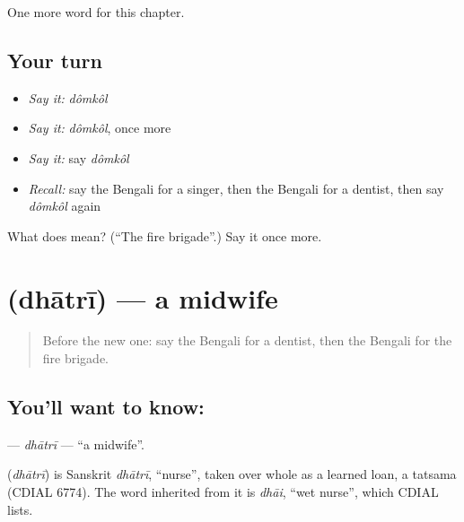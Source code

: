 \begin{grammarlens}[title={What you've built}]
One more word for this chapter.
\end{grammarlens}

\subsection*{Your turn}
\begin{itemize}
\raggedright
  \item \emph{Say it:} \emph{dômkôl}
  \item \emph{Say it:} \emph{dômkôl}, once more
  \item \emph{Say it:} say \emph{dômkôl}
  \item \emph{Recall:} say the Bengali for a singer, then the Bengali for a dentist, then say \emph{dômkôl} again
\end{itemize}

\begin{tcolorbox}[breakable,colback=teal!4,colframe=teal!35!black,title={Before you move on}]
What does  mean? (\textquotedblleft{}The fire brigade\textquotedblright{}.) Say it once more.
\end{tcolorbox}
\section[\texorpdfstring{\bn{ধাত্রী} (dhātrī)}{ধাত্রী (dhātrī)}]{ (dhātrī) — a midwife}

\label{lesson:BN-C178-dhatri}



\begin{quote}
Before the new one: say the Bengali for a dentist, then the Bengali for the fire brigade.
\end{quote}

\subsection*{You'll want to know: }
\textbf{} — \emph{dhātrī} — \textquotedblleft{}a midwife\textquotedblright{}.

\begin{cousinweb}
\textbf{} (\emph{dhātrī}) is Sanskrit \emph{dhātrī}, \textquotedblleft{}nurse\textquotedblright{}, taken over whole as a learned loan, a tatsama (CDIAL 6774). The word inherited from it is \emph{dhāi}, \textquotedblleft{}wet nurse\textquotedblright{}, which CDIAL lists.
\end{cousinweb}

